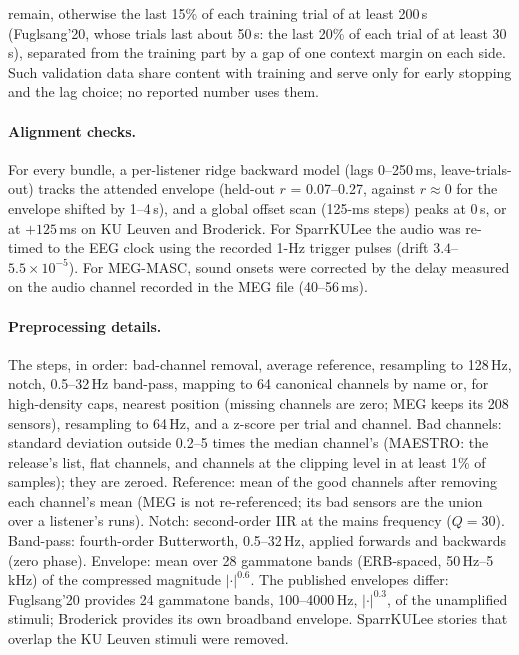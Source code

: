\documentclass[twoside]{article}
\begin{document}
remain, otherwise the last 15\% of each training trial of at least 200\,s (Fuglsang'20,
whose trials last about 50\,s: the last 20\% of each trial of at least 30\,s), separated
from the training part by a gap of one context margin on each side. Such validation data share
content with training and serve only for early stopping and the lag choice; no reported
number uses them.
\begin{table}[h]\centering\small
\caption{Content groups recovered from the audio. Groups per listener: how many groups one
listener heard. Single-trial groups: content heard in one trial only. Links: 64-Hz-confirmed links that
merged two components (trials $-$ groups). Last two columns: best 8-Hz match of a 10-s
chunk in another group, and the 64-Hz correlation at that location: the chance level the
0.95 threshold must exceed.}\label{tab:groups}
\resizebox{\textwidth}{!}{}
\end{table}

\paragraph{Alignment checks.} For every bundle, a per-listener ridge backward model
(lags 0--250\,ms, leave-trials-out) tracks the attended envelope
(held-out $r$ = 0.07--0.27, against $r\approx0$ for the envelope shifted by 1--4\,s), and a
global offset scan (125-ms steps) peaks at 0\,s, or at $+125$\,ms on KU Leuven and Broderick.
For SparrKULee the audio was re-timed to the EEG clock using the recorded 1-Hz trigger
pulses (drift $3.4$--$5.5\times10^{-5}$). For MEG-MASC, sound onsets were corrected by the
delay measured on the audio channel recorded in the MEG file (40--56\,ms).

\paragraph{Preprocessing details.} The steps, in order: bad-channel removal, average
reference, resampling to 128\,Hz, notch, 0.5--32\,Hz band-pass, mapping to 64 canonical
channels by name or, for high-density caps, nearest position (missing channels are zero; MEG
keeps its 208 sensors), resampling to 64\,Hz, and a z-score per trial and channel. Bad channels: standard deviation outside 0.2--5 times the
median channel's (MAESTRO: the release's list, flat channels, and channels at the clipping
level in at least 1\% of samples); they are zeroed. Reference: mean of the good channels
after removing each channel's mean (MEG is not re-referenced; its bad sensors are the union
over a listener's runs). Notch: second-order IIR at the mains frequency ($Q=30$). Band-pass:
fourth-order Butterworth, 0.5--32\,Hz, applied forwards and backwards (zero phase). Envelope:
mean over 28 gammatone bands (ERB-spaced, 50\,Hz--5\,kHz) of the compressed magnitude
$|\cdot|^{0.6}$. The published envelopes differ: Fuglsang'20 provides 24 gammatone bands,
100--4000\,Hz, $|\cdot|^{0.3}$, of the unamplified stimuli; Broderick provides its own
broadband envelope. SparrKULee stories that overlap the KU Leuven stimuli were removed.
\end{document}
